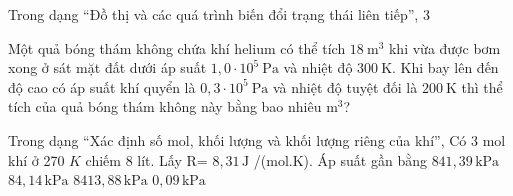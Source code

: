 \begin{bt}
Trong dạng “Đồ thị và các quá trình biến đổi trạng thái liên tiếp”, 3
\end{bt}

\begin{ex}
Một quả bóng thám không chứa khí helium có thể tích $18\ \mathrm{m^3}$ khi vừa được bơm xong ở sát mặt đất dưới áp suất $1,0 \cdot 10^5\ \mathrm{Pa}$ và nhiệt độ $300\ \mathrm{K}$. Khi bay lên đến độ cao có áp suất khí quyển là $0,3 \cdot 10^5\ \mathrm{Pa}$ và nhiệt độ tuyệt đối là $200\ \mathrm{K}$ thì thể tích của quả bóng thám không này bằng bao nhiêu $\mathrm{m^3}$?
\end{ex}

\begin{ex}
Trong dạng “Xác định số mol, khối lượng và khối lượng riêng của khí”, Có 3 mol khí ở 270 $K$ chiếm 8 lít. Lấy R= $8,31\,\text{J}$ /(mol.K). Áp suất gần bằng
\choice
{\True $841,39\,\text{kPa}$}
{$84,14\,\text{kPa}$}
{$8413,88\,\text{kPa}$}
{$0,09\,\text{kPa}$}
\end{ex}

